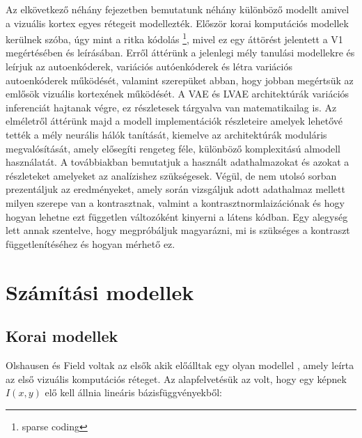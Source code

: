 \documentclass[12pt, english]{article}
\begin{document}
\vspace{7mm}

\par Az elkövetkező néhány fejezetben bemutatunk néhány különböző modellt amivel a vizuális kortex egyes rétegeit modellezték. Először korai komputációs modellek kerülnek szóba, úgy mint a ritka kódolás \footnote{sparse coding}, mivel ez egy áttörést jelentett a V1 megértésében és leírásában. Erről áttérünk a jelenlegi mély tanulási modellekre és leírjuk az autoenkóderek, variációs autóenkóderek és létra variációs autoenkóderek működését, valamint szerepüket abban, hogy jobban megértsük az emlősök vizuális kortexének működését. A VAE és LVAE architektúrák variációs inferenciát hajtanak végre, ez részletesek tárgyalva van matematikailag is. Az elméletről áttérünk majd a modell implementációk részleteire amelyek lehetővé tették a mély neurális hálók tanítását, kiemelve az architektúrák moduláris megvalósítását, amely elősegíti rengeteg féle, különböző komplexitású almodell használatát. A továbbiakban bemutatjuk a használt adathalmazokat és azokat a részleteket amelyeket az analízishez szükségesek. Végül, de nem utolsó sorban prezentáljuk az eredményeket, amely során vizsgáljuk adott adathalmaz mellett milyen szerepe van a kontrasztnak, valmint a kontrasztnormlaizációnak és hogy hogyan lehetne ezt független változóként kinyerni a látens kódban. Egy alegység lett annak szentelve, hogy megpróbáljuk magyarázni, mi is szükséges a kontraszt függetlenítéséhez és hogyan mérhető ez.

\newpage

\section{Számítási modellek}

\vspace{7mm}

\subsection{Korai modellek}

\vspace{5mm}

\par Olshausen és Field voltak az elsők akik előálltak egy olyan modellel \cite{olshausen1996emergence}, amely leírta az első vizuális komputációs réteget. Az alapfelvetésük az volt, hogy egy képnek $I(x, y)$ elő kell állnia lineáris bázisfüggvényekből:
\end{document}
